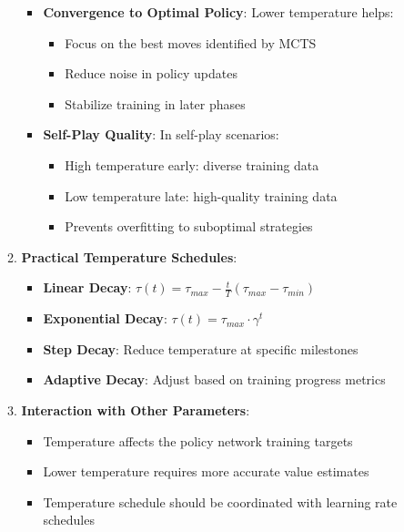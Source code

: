 \begin{itemize}
\begin{enumerate}
\begin{itemize}
            \item \textbf{Convergence to Optimal Policy}: Lower temperature helps:
            \begin{itemize}
                \item Focus on the best moves identified by MCTS
                \item Reduce noise in policy updates
                \item Stabilize training in later phases
            \end{itemize}
            
            \item \textbf{Self-Play Quality}: In self-play scenarios:
            \begin{itemize}
                \item High temperature early: diverse training data
                \item Low temperature late: high-quality training data
                \item Prevents overfitting to suboptimal strategies
            \end{itemize}
        \end{itemize}
        
        \item \textbf{Practical Temperature Schedules}:
        \begin{itemize}
            \item \textbf{Linear Decay}: $\tau(t) = \tau_{max} - \frac{t}{T}(\tau_{max} - \tau_{min})$
            \item \textbf{Exponential Decay}: $\tau(t) = \tau_{max} \cdot \gamma^t$
            \item \textbf{Step Decay}: Reduce temperature at specific milestones
            \item \textbf{Adaptive Decay}: Adjust based on training progress metrics
        \end{itemize}
        
        \item \textbf{Interaction with Other Parameters}:
        \begin{itemize}
            \item Temperature affects the policy network training targets
            \item Lower temperature requires more accurate value estimates
            \item Temperature schedule should be coordinated with learning rate schedules
        \end{itemize}
    \end{enumerate}
\end{itemize}


